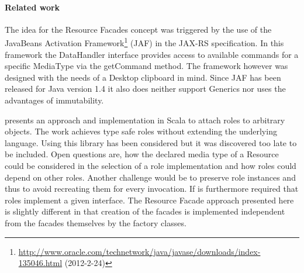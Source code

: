 \documentclass[12pt,a4paper,twoside]{scrartcl}		%
\newcommand{\citeurl}[2]{\url{#1} (#2)}
\begin{document}



\paragraph{Related work}
\label{sec:resourcefacadesrelated-work}

The idea for the Resource Facades concept was triggered by the use of the
JavaBeans Activation
Framework\footnote{\citeurl{http://www.oracle.com/technetwork/java/javase/downloads/index-135046.html}{2012-2-24}}
(JAF) in the JAX-RS specification. In this framework the DataHandler interface
provides access to available commands for a specific MediaType via the
getCommand method. The framework however was designed with the needs of a
Desktop clipboard in mind. Since JAF has been released for Java version 1.4 it
also does neither support Generics nor uses the advantages of immutability.

\cite{Pradel2008a} presents an approach and implementation in Scala to attach
roles to arbitrary objects. The work achieves type safe roles without extending
the underlying language. Using this library has been considered but it was
discovered too late to be included. Open questions are, how the declared media
type of a Resource could be considered in the selection of a role implementation
and how roles could depend on other roles. Another challenge would be to
preserve role instances and thus to avoid recreating them for every
invocation. If is furthermore required that roles implement a given
interface. The Resource Facade approach presented here is slightly different in
that creation of the facades is implemented independent from the facades
themselves by the factory classes.
\end{document}
